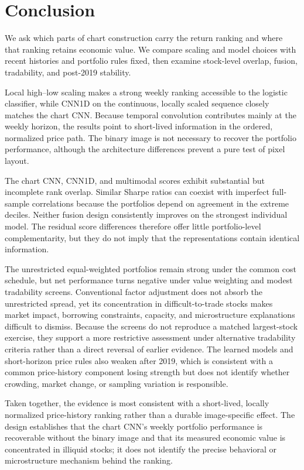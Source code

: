 \section{Conclusion}\label{sec:conclusion}

We ask which parts of chart construction carry the return ranking and where that ranking retains economic value. We compare scaling and model choices with recent histories and portfolio rules fixed, then examine stock-level overlap, fusion, tradability, and post-2019 stability.

Local high--low scaling makes a strong weekly ranking accessible to the logistic classifier, while CNN1D on the continuous, locally scaled sequence closely matches the chart CNN. Because temporal convolution contributes mainly at the weekly horizon, the results point to short-lived information in the ordered, normalized price path. The binary image is not necessary to recover the portfolio performance, although the architecture differences prevent a pure test of pixel layout.

The chart CNN, CNN1D, and multimodal scores exhibit substantial but incomplete rank overlap. Similar Sharpe ratios can coexist with imperfect full-sample correlations because the portfolios depend on agreement in the extreme deciles. Neither fusion design consistently improves on the strongest individual model. The residual score differences therefore offer little portfolio-level complementarity, but they do not imply that the representations contain identical information.

The unrestricted equal-weighted portfolios remain strong under the common cost schedule, but net performance turns negative under value weighting and modest tradability screens. Conventional factor adjustment does not absorb the unrestricted spread, yet its concentration in difficult-to-trade stocks makes market impact, borrowing constraints, capacity, and microstructure explanations difficult to dismiss. Because the screens do not reproduce a matched largest-stock exercise, they support a more restrictive assessment under alternative tradability criteria rather than a direct reversal of earlier evidence. The learned models and short-horizon price rules also weaken after 2019, which is consistent with a common price-history component losing strength but does not identify whether crowding, market change, or sampling variation is responsible.

Taken together, the evidence is most consistent with a short-lived, locally normalized price-history ranking rather than a durable image-specific effect. The design establishes that the chart CNN's weekly portfolio performance is recoverable without the binary image and that its measured economic value is concentrated in illiquid stocks; it does not identify the precise behavioral or microstructure mechanism behind the ranking.
